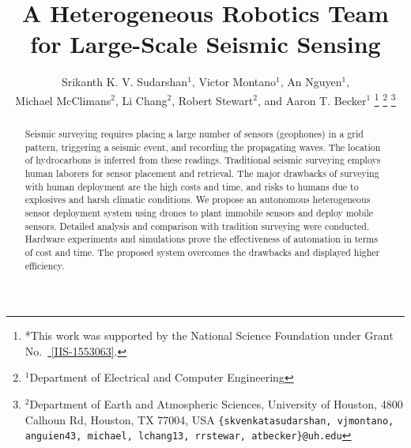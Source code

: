 \documentclass[letterpaper, 10 pt, conference]{ieeeconf}
\begin{document}
%
\title{\LARGE \bf A Heterogeneous Robotics Team for Large-Scale Seismic Sensing} 

\author{Srikanth K. V. Sudarshan$^{1}$,
Victor Montano$^{1}$,
An Nguyen$^{1}$,\\ 
Michael McClimans$^{2}$,
Li Chang$^{2}$,
Robert Stewart$^{2}$, and
 Aaron T. Becker$^{1}$%
\thanks{*This work was supported by the National Science Foundation under Grant No.\ \href{http://nsf.gov/awardsearch/showAward?AWD_ID=1553063}{ [IIS-1553063]}.}%
\thanks{$^{1}$Department of Electrical and Computer Engineering}
\thanks{$^{2}$Department of Earth and Atmospheric Sciences, University of Houston, 4800 Calhoun Rd, Houston, TX 77004, USA
        {\tt\small \{skvenkatasudarshan, vjmontano, anguien43, michael, lchang13, rrstewar, atbecker\}@uh.edu}}%
}



\maketitle
\thispagestyle{empty}
\pagestyle{empty}


\begin{abstract} 
Seismic surveying requires placing a large number of sensors (geophones) in a grid pattern, triggering a seismic event, and recording the propagating waves. 
The location of hydrocarbons is inferred from these readings.
Traditional seismic surveying employs human laborers for sensor placement and retrieval. 
The major drawbacks of surveying with human deployment are the high costs and time, and risks to humans due to explosives and harsh climatic conditions.
We propose an autonomous heterogeneous sensor deployment system using drones to plant immobile sensors and deploy mobile sensors.
Detailed analysis and comparison with tradition surveying were conducted. 
Hardware experiments and simulations prove the effectiveness of automation in terms of cost and time. 
The proposed system overcomes the drawbacks and displayed higher efficiency.
\end{abstract}


%

%

%

%

%

%






\end{document}
